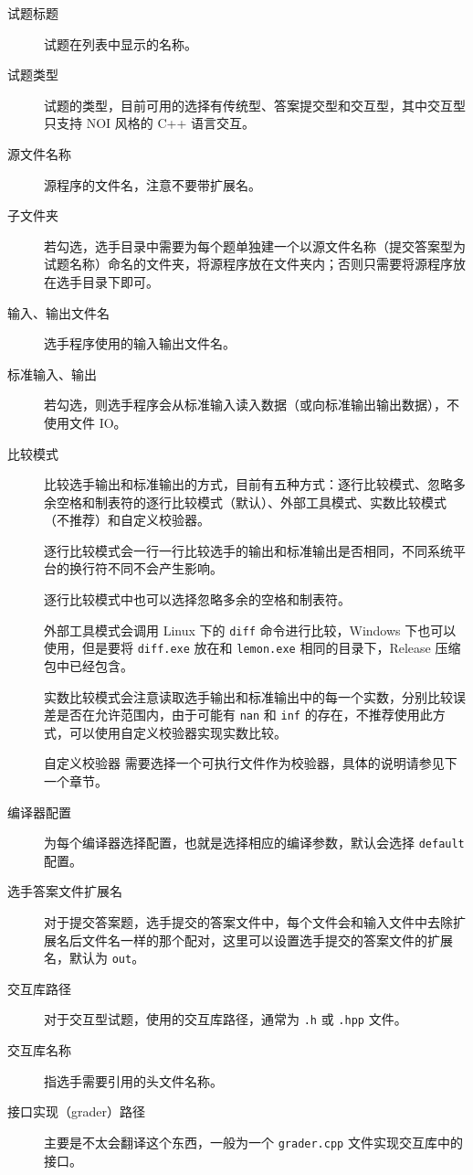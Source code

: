 \documentclass[12pt, a4paper]{article}
\begin{document}
\begin{description}
\item[试题标题] 试题在列表中显示的名称。
\item[试题类型] 试题的类型，目前可用的选择有传统型、答案提交型和交互型，其中交互型只支持 NOI 风格的 C++ 语言交互。
\item[源文件名称] 源程序的文件名，注意不要带扩展名。
\item[子文件夹] 若勾选，选手目录中需要为每个题单独建一个以源文件名称（提交答案型为试题名称）命名的文件夹，将源程序放在文件夹内；否则只需要将源程序放在选手目录下即可。
\item[输入、输出文件名] 选手程序使用的输入输出文件名。
\item[标准输入、输出] 若勾选，则选手程序会从标准输入读入数据（或向标准输出输出数据），不使用文件 IO。
\item[比较模式] 比较选手输出和标准输出的方式，目前有五种方式：逐行比较模式、忽略多余空格和制表符的逐行比较模式（默认）、外部工具模式、实数比较模式（不推荐）和自定义校验器。

逐行比较模式会一行一行比较选手的输出和标准输出是否相同，不同系统平台的换行符不同不会产生影响。

逐行比较模式中也可以选择忽略多余的空格和制表符。

外部工具模式会调用 Linux 下的 \texttt{diff} 命令进行比较，Windows 下也可以使用，但是要将 \texttt{diff.exe} 放在和 \texttt{lemon.exe} 相同的目录下，Release 压缩包中已经包含。

实数比较模式会注意读取选手输出和标准输出中的每一个实数，分别比较误差是否在允许范围内，由于可能有 \texttt{nan} 和 \texttt{inf} 的存在，不推荐使用此方式，可以使用自定义校验器实现实数比较。

自定义校验器 需要选择一个可执行文件作为校验器，具体的说明请参见下一个章节。
\item[编译器配置] 为每个编译器选择配置，也就是选择相应的编译参数，默认会选择 \texttt{default} 配置。
\item[选手答案文件扩展名] 对于提交答案题，选手提交的答案文件中，每个文件会和输入文件中去除扩展名后文件名一样的那个配对，这里可以设置选手提交的答案文件的扩展名，默认为 \texttt{out}。
\item[交互库路径] 对于交互型试题，使用的交互库路径，通常为 \texttt{.h} 或 \texttt{.hpp} 文件。
\item[交互库名称] 指选手需要引用的头文件名称。
\item[接口实现（grader）路径] 主要是不太会翻译这个东西，一般为一个 \texttt{grader.cpp} 文件实现交互库中的接口。   
\end{description}
\end{document}
